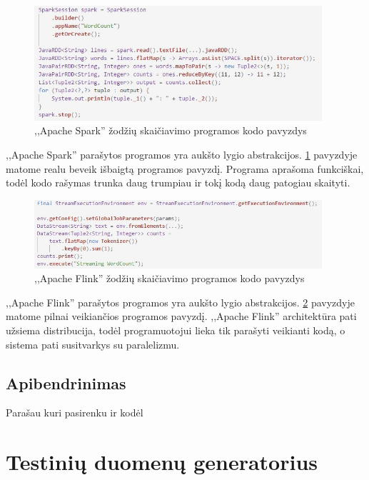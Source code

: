 \documentclass{VUMIFPSkursinis}
\begin{document}
\begin{figure}[!htbp]
    \centering
    \includegraphics[width=0.95\textwidth]{img/SparkAPI.jpg}
    \caption{,,Apache Spark'' žodžių skaičiavimo programos kodo pavyzdys}
    \label{fig:sparkapi}
\end{figure} \par

,,Apache Spark'' parašytos programos yra aukšto lygio abstrakcijos. \ref{fig:sparkapi} pavyzdyje matome realu beveik išbaigtą programos pavyzdį. Programa aprašoma funkciškai, todėl kodo rašymas trunka daug trumpiau
ir tokį kodą daug patogiau skaityti.

\begin{figure}[!htbp]
    \centering
    \includegraphics[width=0.95\textwidth]{img/FlinkAPI.jpg}
    \caption{,,Apache Flink'' žodžių skaičiavimo programos kodo pavyzdys}
    \label{fig:flinkapi}
\end{figure} \par

,,Apache Flink'' parašytos programos yra aukšto lygio abstrakcijos. \ref{fig:flinkapi} pavyzdyje matome pilnai veikiančios programos pavyzdį. ,,Apache Flink'' architektūra pati užsiema distribucija, todėl
programuotojui lieka tik parašyti veikianti kodą, o sistema pati susitvarkys su paralelizmu.

\subsection{Apibendrinimas}

Parašau kuri pasirenku ir kodėl

\section{Testinių duomenų generatorius}
\end{document}
